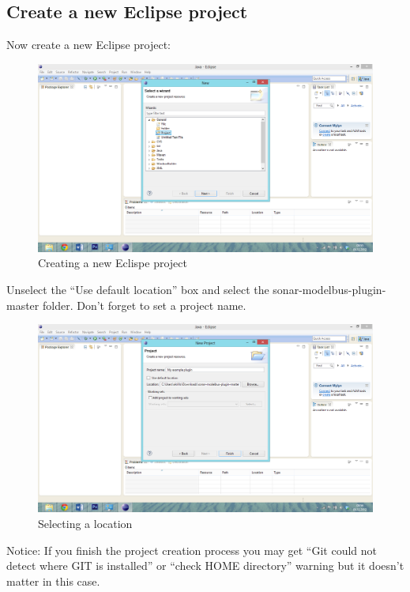 \subsection{Create a new Eclipse project}
Now create a new Eclipse project:

\begin{figure}
	\centering
		\includegraphics[width=\textwidth]{neweclipseproject}
	\caption{Creating a new Eclispe project}
	\label{fig:neweclipseproject}
\end{figure}

Unselect the "`Use default location"' box and select the sonar-modelbus-plugin-master folder. Don't forget to set a project name.
 
\begin{figure}
	\centering
		\includegraphics[width=\textwidth]{selectlocation}
	\caption{Selecting a location}
	\label{fig:selectlocation}
\end{figure}

Notice: If you finish the project creation process you may get
"`Git could not detect where GIT is installed"' or "`check HOME directory"' warning but it doesn't matter in this case.




